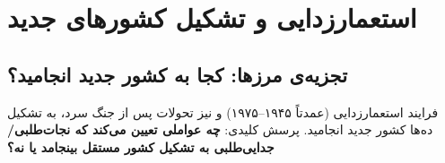 \section{استعمارزدایی و تشکیل کشورهای جدید}
\label{sec:ch09-decolonization}

\subsection{تجزیه‌ی مرزها: کجا به کشور جدید انجامید؟}
\label{subsec:ch09-new-states}

فرایند استعمارزدایی (عمدتاً ۱۹۴۵–۱۹۷۵) و نیز تحولات پس از جنگ سرد، به تشکیل ده‌ها کشور جدید انجامید. پرسش کلیدی: \textbf{چه عواملی تعیین می‌کند که نجات‌طلبی/جدایی‌طلبی به تشکیل کشور مستقل بینجامد یا نه؟}

